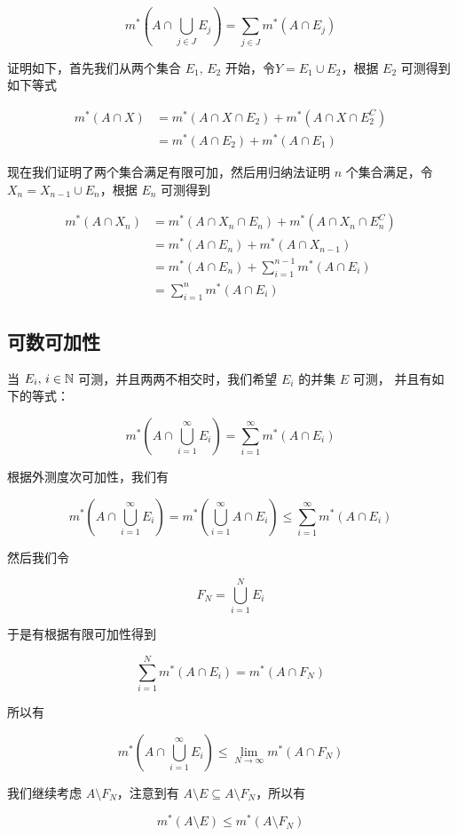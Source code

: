 \[
m^*(A \cap \bigcup_{j \in J}E_j) = \sum_{j \in J}m^*(A \cap E_j)
\]

证明如下，首先我们从两个集合 $E_1, \, E_2$ 开始，令$Y = E_1 \cup E_2$，根据 $E_2$ 可测得到如下等式

\begin{align*}
    m^*(A \cap X) &= m^*(A \cap X \cap E_2) + m^*(A \cap X \cap E_2 ^C) \\
    &= m^*(A \cap E_2) + m^*(A \cap E_1)
\end{align*}

现在我们证明了两个集合满足有限可加，然后用归纳法证明 $n$ 个集合满足，令 $X_n = X_{n-1} \cup E_n$，根据 $E_n$ 可测得到


\begin{align*}
    m^*(A \cap X_n) &= m^*(A \cap X_n \cap E_n) + m^*(A \cap X_n \cap E_n ^C) \\
    &= m^*(A \cap E_n) + m^*(A \cap X_{n-1}) \\
    &= m^*(A \cap E_n) + \sum_{i=1}^{n-1}m^*(A \cap E_i) \\
    &= \sum_{i=1}^{n}m^*(A \cap E_i)
\end{align*}

\subsection{可数可加性}

当 $E_i,\, i \in \mathbb{N}$ 可测，并且两两不相交时，我们希望 $E_i$ 的并集 $E$ 可测， 并且有如下的等式：

\[
    m^*(A \cap \bigcup_{i=1}^{\infty}E_i) = \sum_{i=1}^{\infty}m^*(A \cap E_i)
\]

根据外测度次可加性，我们有

\[
m^*(A \cap \bigcup_{i=1}^{\infty}E_i) = m^*(\bigcup_{i =1}^{\infty}A \cap E_i) \le \sum_{i=1}^{\infty}m^*(A \cap E_i)
\]

然后我们令

\[
F_N = \bigcup_{i=1}^{N}E_i
\]

于是有根据有限可加性得到

\[
\sum_{i=1}^{N}m^*(A \cap E_i) = m^*(A \cap F_N)
\]

所以有

\[
m^*(A \cap \bigcup_{i=1}^{\infty}E_i) \le \lim_{N \to \infty}m^*(A \cap F_N)
\]

我们继续考虑 $A \setminus F_N$，注意到有 $A \setminus E \subseteq A \setminus F_N$，所以有

\[
m^*(A \setminus E) \le m^*(A \setminus F_N)
\]

